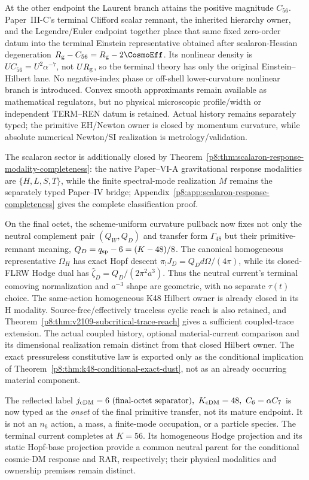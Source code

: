 \documentclass[12pt,a4paper]{article}
\begin{document}
At the other endpoint the Laurent branch attains the positive magnitude
\(C_{56}\).  Paper~III-C's terminal Clifford scalar remnant, the inherited
hierarchy owner, and the Legendre/Euler endpoint together place that same fixed
zero-order datum into the terminal Einstein representative obtained after scalaron-Hessian degeneration
\(R_{\rm g}-C_{56}=R_{\rm g}-2\CosmoEff\).  Its nonlinear density is
\(U C_{56}=U^2\alpha^{-7}\), not \(U R_{\rm g}\), so the
terminal theory has only the original Einstein--Hilbert lane.  No
negative-index phase or off-shell lower-curvature nonlinear branch is
introduced.  Convex smooth approximants remain available as mathematical regulators, but
no physical microscopic profile/width or independent TERM--REN datum is
retained.  Actual history remains separately typed; the primitive EH/Newton owner is
closed by momentum curvature, while absolute numerical Newton/SI realization is
metrology/validation.

The scalaron sector is additionally closed by Theorem~\ref{p8:thm:scalaron-response-modality-completeness}: the native Paper--VI-A gravitational response modalities are $\{H,L,S,T\}$, while the finite spectral-mode realization $M$ remains the separately typed Paper--IV bridge; Appendix~\ref{p8:app:scalaron-response-completeness} gives the complete classification proof.

On the final octet, the scheme-uniform curvature pullback now fixes not only
the neutral complement pair $(Q_W,Q_D)$ and transfer form $\Gamma_{48}$ but
their primitive-remnant meaning,
\(Q_D=q_{\rm sp}-6=(K-48)/8\).  The canonical homogeneous representative
\(\Omega_H\) has exact Hopf descent
\(\pi_!J_D=Q_Dd\Omega/(4\pi)\), while its closed-FLRW Hodge dual has
\(\widehat\zeta_D=Q_D/(2\pi^2a^3)\).  Thus the neutral current's terminal
comoving normalization and $a^{-3}$ shape are geometric, with no separate
$\tau(t)$ choice.  The same-action homogeneous K48 Hilbert owner is
already closed in its H modality.  Source-free/effectively traceless cyclic
reach is also retained, and Theorem~\ref{p8:thm:v2109-subcritical-trace-reach}
gives a sufficient coupled-trace extension.  The actual coupled history,
optional material-current comparison and its dimensional realization remain
distinct from that closed Hilbert owner.  The exact pressureless
constitutive law is exported only as the
conditional implication of Theorem~\ref{p8:thm:k48-conditional-exact-dust},
not as an already occurring material component.

The reflected label
\(j_{\rm cDM}=6\ \text{(final-octet separator)},\ K_{\rm cDM}=48,\ C_6=\alpha C_7\) is now typed as the
\emph{onset} of the final primitive transfer, not its mature endpoint.  It is
not an \(n_6\) action, a mass, a finite-mode occupation, or a particle species.
The terminal current completes at $K=56$.  Its homogeneous Hodge projection
and its static Hopf-base projection provide a common neutral parent for the
conditional cosmic-DM response and RAR, respectively; their physical
modalities and ownership premises remain distinct.
\end{document}
